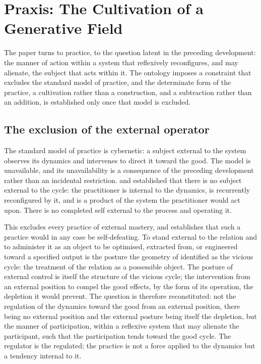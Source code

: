 \section{Praxis: The Cultivation of a Generative Field}
\label{p10:sec:praxis}

\noindent
The paper turns to practice, to the question latent in the preceding development: the manner of action within a system that reflexively reconfigures, and may alienate, the subject that acts within it. The ontology imposes a constraint that excludes the standard model of practice, and the determinate form of the practice, a cultivation rather than a construction, and a subtraction rather than an addition, is established only once that model is excluded.

\subsection{The exclusion of the external operator}
\label{p10:sec:no-operator}

The standard model of practice is cybernetic: a subject external to the system observes its dynamics and intervenes to direct it toward the good. The model is unavailable, and its unavailability is a consequence of the preceding development rather than an incidental restriction.  and  established that there is no subject external to the cycle: the practitioner is internal to the dynamics, is recurrently reconfigured by it, and is a product of the system the practitioner would act upon. There is no completed self external to the process and operating it.

This excludes every practice of external mastery, and establishes that such a practice would in any case be self-defeating. To stand external to the relation and to administer it as an object to be optimised, extracted from, or engineered toward a specified output is the posture the geometry of  identified as the vicious cycle: the treatment of the relation as a possessible object. The posture of external control is itself the structure of the vicious cycle; the intervention from an external position to compel the good effects, by the form of its operation, the depletion it would prevent. The question is therefore reconstituted: not the regulation of the dynamics toward the good from an external position, there being no external position and the external posture being itself the depletion, but the manner of participation, within a reflexive system that may alienate the participant, such that the participation tends toward the good cycle. The regulator is the regulated; the practice is not a force applied to the dynamics but a tendency internal to it.

